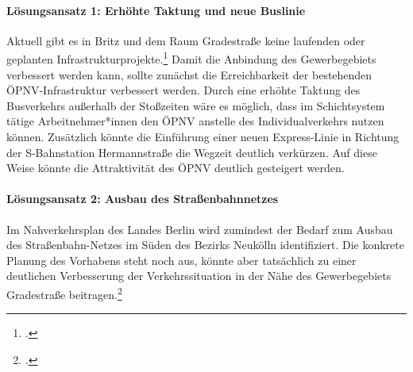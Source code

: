 \paragraph{Lösungsansatz 1: Erhöhte Taktung und neue Buslinie}
Aktuell gibt es in Britz und dem Raum Gradestraße keine laufenden oder geplanten Infrastrukturprojekte.\footcite{NahverkehrsplanBerlin} Damit die Anbindung des Gewerbegebiets verbessert werden kann, sollte zunächst die Erreichbarkeit der bestehenden ÖPNV-Infrastruktur verbessert werden. Durch eine erhöhte Taktung des Busverkehrs außerhalb der Stoßzeiten wäre es möglich, dass im Schichtsystem tätige Arbeitnehmer*innen den ÖPNV anstelle des Individualverkehrs nutzen können. Zusätzlich könnte die Einführung einer neuen Express-Linie in Richtung der S-Bahnstation Hermannstraße die Wegzeit deutlich verkürzen. Auf diese Weise könnte die Attraktivität des ÖPNV deutlich gesteigert werden.

\paragraph{Lösungsansatz 2: Ausbau des Straßenbahnnetzes}
Im Nahverkehrsplan des Landes Berlin wird zumindest der Bedarf zum Ausbau des Straßenbahn-Netzes im Süden des Bezirks Neukölln identifiziert. Die konkrete Planung des Vorhabens steht noch aus, könnte aber tatsächlich zu einer deutlichen Verbesserung der Verkehrssituation in der Nähe des Gewerbegebiets Gradestraße beitragen.\footcite{NahverkehrsplanBerlin}
